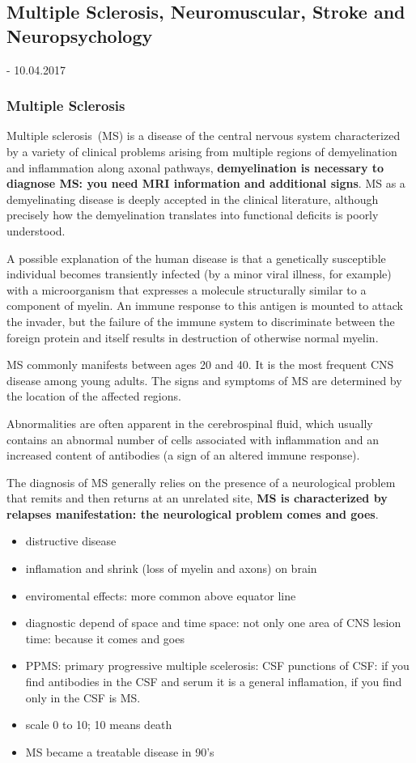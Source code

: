 \documentclass[12pt,article,oneside,a4paper]{memoir}
\begin{document}
\newpage
\subsection{Multiple Sclerosis, Neuromuscular, Stroke and Neuropsychology}
- 10.04.2017

\subsubsection{Multiple Sclerosis}

Multiple sclerosis~(MS) is a disease of the central nervous system
characterized by a variety of clinical problems arising from multiple regions
of demyelination and inflammation along axonal pathways, \textbf{demyelination
is necessary to diagnose MS: you need MRI information and additional signs}. MS
as a demyelinating disease is deeply accepted in the clinical literature,
although precisely how the demyelination translates into functional deficits is
poorly understood.

A possible explanation of the human disease is that a genetically susceptible
individual becomes transiently infected (by a minor viral illness, for example)
with a  microorganism that expresses a molecule structurally similar to a
component of myelin. An immune response to this antigen is mounted to attack
the invader, but the failure of the immune system to discriminate between the
foreign protein and itself results in destruction of otherwise normal myelin.

MS commonly manifests between ages 20 and 40. It is the most frequent CNS
disease among young adults. The signs and symptoms of MS are determined by the
location of the affected regions.

Abnormalities are often apparent in the cerebrospinal fluid, which usually
contains an abnormal number of cells associated with inflammation and an
increased content of antibodies (a sign of an altered immune response).

The diagnosis of MS generally relies on the presence of a neurological problem
that remits and then returns at an unrelated site, \textbf{MS is characterized
by relapses manifestation: the neurological problem comes and goes}.

\begin{itemize}
\item distructive disease
\item inflamation and shrink (loss of myelin and axons) on brain
\item enviromental effects: more common above equator line
\item diagnostic depend of space and time
\subitem space: not only one area of CNS lesion
\subitem time: because it comes and goes
\item PPMS: primary progressive multiple scelerosis: CSF
\subitem punctions of CSF: if you find antibodies in the CSF and serum it is a
general inflamation, if you find only in the CSF is MS.
\item scale 0 to 10; 10 means death
\item MS became a treatable disease in 90's
\end{itemize}
\end{document}
